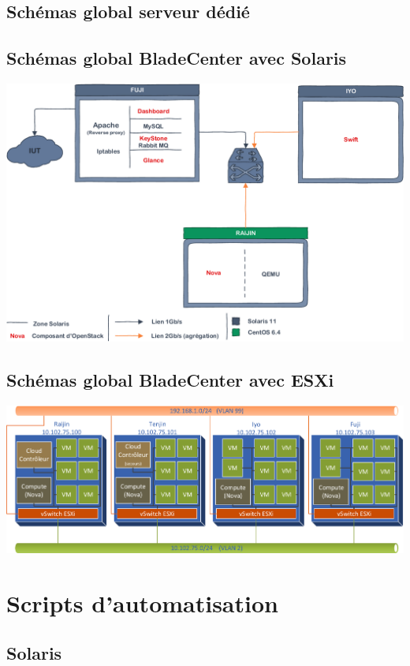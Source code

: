 \documentclass[a4paper,oneside]{report}
\begin{document}
\section{Schémas global serveur dédié}
\section{Schémas global BladeCenter avec Solaris} \label{sch:glob}
\begin{center}
\includegraphics[scale=0.8,angle=90]{images/topoBladeSolaris-crop.pdf}
\end{center}
\section{Schémas global BladeCenter avec ESXi}
\begin{center}
\includegraphics[scale=1,angle=90]{images/SchemaBladeESXi-crop.pdf}
\end{center}

\chapter{Scripts d'automatisation}
\section{Solaris}
\end{document}
